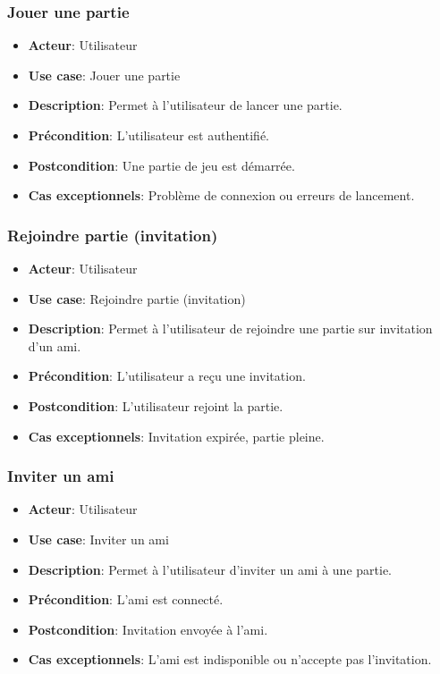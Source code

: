 \documentclass{article}
\begin{document}
\subsubsection{Jouer une partie}
\begin{itemize}
    \item \textbf{Acteur}: Utilisateur
    \item \textbf{Use case}: Jouer une partie
    \item \textbf{Description}: Permet à l'utilisateur de lancer une partie.
    \item \textbf{Précondition}: L'utilisateur est authentifié.
    \item \textbf{Postcondition}: Une partie de jeu est démarrée.
    \item \textbf{Cas exceptionnels}: Problème de connexion ou erreurs de lancement.
\end{itemize}

\subsubsection{Rejoindre partie (invitation)}
\begin{itemize}
    \item \textbf{Acteur}: Utilisateur
    \item \textbf{Use case}: Rejoindre partie (invitation)
    \item \textbf{Description}: Permet à l'utilisateur de rejoindre une partie sur invitation d'un ami.
    \item \textbf{Précondition}: L'utilisateur a reçu une invitation.
    \item \textbf{Postcondition}: L'utilisateur rejoint la partie.
    \item \textbf{Cas exceptionnels}: Invitation expirée, partie pleine.
\end{itemize}

\subsubsection{Inviter un ami}
\begin{itemize}
    \item \textbf{Acteur}: Utilisateur
    \item \textbf{Use case}: Inviter un ami
    \item \textbf{Description}: Permet à l'utilisateur d'inviter un ami à une partie.
    \item \textbf{Précondition}: L'ami est connecté.
    \item \textbf{Postcondition}: Invitation envoyée à l'ami.
    \item \textbf{Cas exceptionnels}: L'ami est indisponible ou n'accepte pas l'invitation.
\end{itemize}
\end{document}
